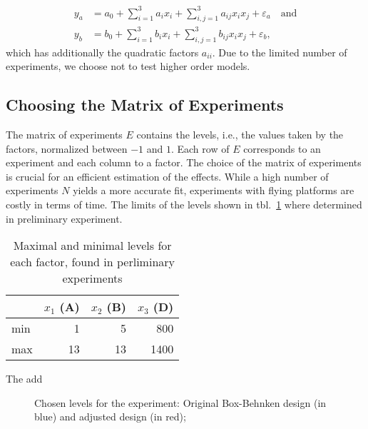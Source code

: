 \begin{subequations}\label{eq:model_quadr}
\begin{align}
	y_a &= a_0 + \displaystyle\sum_{i=1}^{3} a_i x_i + \displaystyle\sum_{i,j=1}^{3} a_{ij} x_i x_j + \varepsilon_a \quad \text{and}\\ 
	y_b &= b_0 + \displaystyle\sum_{i=1}^{3} b_i x_i + \displaystyle\sum_{i,j=1}^{3} b_{ij} x_i x_j + \varepsilon_b,
\end{align}
\end{subequations}
which has additionally the quadratic factors $a_{ii}$.
Due to the limited number of experiments, we choose not to test higher order models.

\subsection{Choosing the Matrix of Experiments}
The matrix of experiments $E$ contains the levels, i.e., the values taken by the factors, normalized between $-1$ and $1$. Each row of $E$ corresponds to an experiment and each column to a factor. The choice of the matrix of experiments is crucial for an efficient estimation of the effects. While a high number of experiments $N$ yields a more accurate fit, experiments with flying platforms are costly in terms of time. The limits of the levels shown in tbl.~\ref{tbl:levels} where determined in preliminary experiment.
\begin{table}[h!]
	\centering
	\begin{tabular}{l r r r}
	 & $x_1$ (A) & $x_2$ (B) & $x_3$ (D) \\\hline
	min & 1 & 5 & 800\\
	max & 13 & 13 & 1400 \\
	\end{tabular}
	\caption{Maximal and minimal levels for each factor, found in perliminary experiments}\label{tbl:levels}
\end{table}
The add\begin{figure}[h]
    \centering
	\setlength{\abovecaptionskip}{1pt plus 3pt minus 0pt}
	\setlength{\figH}{0.25\textwidth}
	
    \caption{Chosen levels for the experiment: Original Box-Behnken design (in blue) and adjusted design (in red);}\label{fig:design}
\end{figure} 

